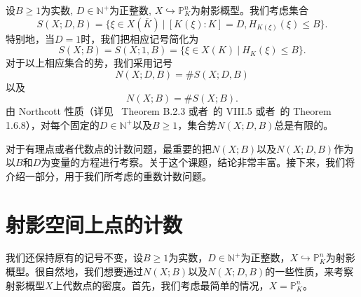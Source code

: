 设$B \geqslant 1$为实数, $D\in\mathbb{N}^+$为正整数, $X\hookrightarrow\mathbb P^n_K$为射影概型。我们考虑集合
\begin{equation} \label{S(X;D,B)}
S(X;D,B) = \{\xi \in X(\overline{K}) \ |\ [K(\xi):K]=D, H_{K(\xi)}(\xi) \leqslant B\}.
\end{equation}
特别地，当$D=1$时，我们把相应记号简化为
\begin{equation}\label{S(X;B)}
S(X;B) = S(X;1,B) = \{\xi\in X(K) \ |\ H_K(\xi)\leqslant B\}.
\end{equation}
对于以上相应集合的势，我们采用记号
\begin{equation} \label{N(X;D,B)}
N(X;D,B) = \#S(X;D,B)
\end{equation}
以及
\begin{equation} \label{N(X;B)}
N(X;B) = \#S(X;B).
\end{equation}
由 Northcott 性质（详见~ Theorem B.2.3 或者~的 VIII.5 或者~的 Theorem 1.6.8），对每个固定的$D \in \mathbb{N}^+$以及$B \geqslant 1$，集合势$N(X;D,B)$总是有限的。


对于有理点或者代数点的计数问题，最重要的把$N(X;B)$以及$N(X;D,B)$作为以$B$和$D$为变量的方程进行考察。关于这个课题，结论非常丰富。接下来，我们将介绍一部分，用于我们所考虑的重数计数问题。

\section{射影空间上点的计数}
我们还保持原有的记号不变，设$B \geqslant 1$为实数，$D \in \mathbb{N}^+$为正整数，$X \hookrightarrow \mathbb{P}^n_K$为射影概型。很自然地，我们想要通过$N(X;B)$以及$N(X;D,B)$的一些性质，来考察射影概型$X$上代数点的密度。首先，我们考虑最简单的情况，$X = \mathbb{P}^n_K$。

